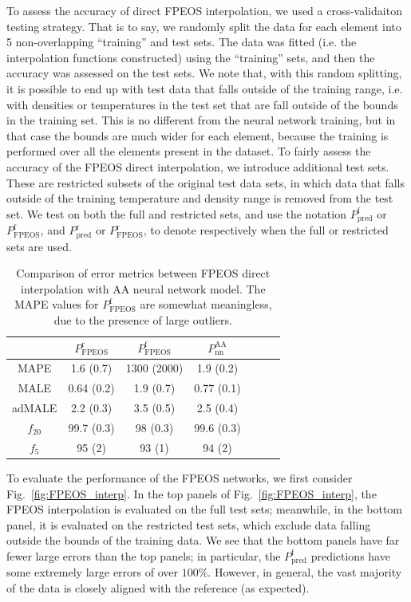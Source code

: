 \documentclass[%
 preprint,
 superscriptaddress,
 amsmath,amssymb,
longbibliography,
]{revtex4-2}
\newcommand{\Paa}{P_\textrm{nn}^\textrm{AA}}
\newcommand{\Ppredf}{P_\textrm{pred}^\textrm{f}}
\newcommand{\Ppredr}{P_\textrm{pred}^\textrm{r}}
\begin{document}
To assess the accuracy of direct FPEOS interpolation, we used a cross-validaiton testing strategy. That is to say, we randomly split the data for each element into 5 non-overlapping ``training'' and test sets. The data was fitted (i.e. the interpolation functions constructed) using the ``training'' sets, and then the accuracy was assessed on the test sets. We note that, with this random splitting, it is possible to end up with test data that falls outside of the training range, i.e. with densities or temperatures in the test set that are fall outside of the bounds in the training set. This is no different from the neural network training, but in that case the bounds are much wider for each element, because the training is performed over all the elements present in the dataset. To fairly assess the accuracy of the FPEOS direct interpolation, we introduce additional test sets. These are restricted subsets of the original test data sets, in which data that falls outside of the training temperature and density range is removed from the test set. We test on both the full and restricted sets, and use the notation $\Ppredf$ or $P_\textrm{FPEOS}^\textrm{f}$, and $\Ppredr$ or $P_\textrm{FPEOS}^\textrm{r}$, to denote respectively when the full or restricted sets are used.



\begin{table}[]
    \centering
    \begin{tabular}{ccccccc}
        \toprule
         & $P_\textrm{FPEOS}^\textrm{r}$ & $P_\textrm{FPEOS}^\textrm{f}$ & $\Paa$ \\ \midrule
         MAPE & 1.6 (0.7) & 1300 (2000) & 1.9 (0.2) \\
         MALE &  0.64 (0.2) & 1.9 (0.7) & 0.77 (0.1)\\
         adMALE & 2.2 (0.3) & 3.5 (0.5) & 2.5 (0.4)\\
         $f_{20}$ & 99.7 (0.3) & 98 (0.3) & 99.6 (0.3) \\
         $f_5$ & 95 (2) & 93 (1) & 94 (2)\\
         \bottomrule
    \end{tabular}
    \caption{Comparison of error metrics between FPEOS direct interpolation with AA neural network model. The MAPE values for $P_\textrm{FPEOS}^\textrm{f}$ are somewhat meaningless, due to the presence of large outliers.}
    \label{tab:fpeos_vs_aa}
\end{table}

To evaluate the performance of the FPEOS networks, we first consider Fig.~\ref{fig:FPEOS_interp}. In the top panels of Fig.~\ref{fig:FPEOS_interp}, the FPEOS interpolation is evaluated on the full test sets; meanwhile, in the bottom panel, it is evaluated on the restricted test sets, which exclude data falling outside the bounds of the training data. We see that the bottom panels have far fewer large errors than the top panels; in particular, the $\Ppredf$ predictions have some extremely large errors of over $100\%$. However, in general, the vast majority of the data is closely aligned with the reference (as expected). 
\end{document}

